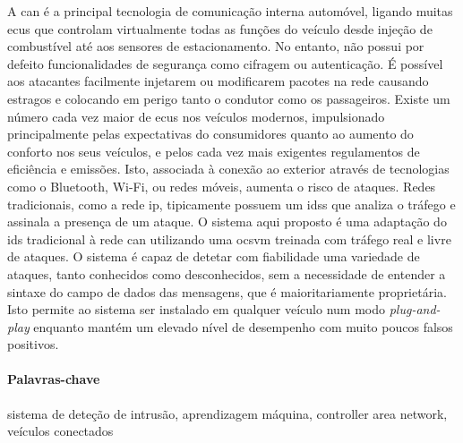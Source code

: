 A \gls{can} é a principal tecnologia de comunicação interna automóvel, ligando muitas \glspl{ecu} que controlam virtualmente todas as funções do veículo desde injeção de combustível até aos sensores de estacionamento. No entanto, não possui por defeito funcionalidades de segurança como cifragem ou autenticação. É possível aos atacantes facilmente injetarem ou modificarem pacotes na rede causando estragos e colocando em perigo tanto o condutor como os passageiros. Existe um número cada vez maior de \glspl{ecu} nos veículos modernos, impulsionado principalmente pelas expectativas do consumidores quanto ao aumento do conforto nos seus veículos, e pelos cada vez mais exigentes regulamentos de eficiência e emissões. Isto, associada à conexão ao exterior através de tecnologias como o Bluetooth, Wi-Fi, ou redes móveis, aumenta o risco de ataques. Redes tradicionais, como a rede \gls{ip}, tipicamente possuem um \glspl{ids} que analiza o tráfego e assinala a presença de um ataque. O sistema aqui proposto é uma adaptação do \gls{ids} tradicional à rede \gls{can} utilizando uma \gls{ocsvm} treinada com tráfego real e livre de ataques. O sistema é capaz de detetar com fiabilidade uma variedade de ataques, tanto conhecidos como desconhecidos, sem a necessidade de entender a sintaxe do campo de dados das mensagens, que é maioritariamente proprietária. Isto permite ao sistema ser instalado em qualquer veículo num modo \textit{plug-and-play} enquanto mantém um elevado nível de desempenho com muito poucos falsos positivos.

\paragraph{Palavras-chave} sistema de deteção de intrusão, aprendizagem máquina, controller area network, veículos conectados